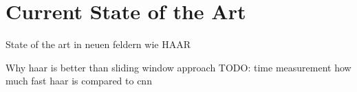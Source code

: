 
\chapter{Current State of the Art} \label{cha:Current State of the Art}

State of the art in neuen feldern wie HAAR


Why haar is better than sliding window approach
TODO: time measurement how much fast haar is compared to cnn
